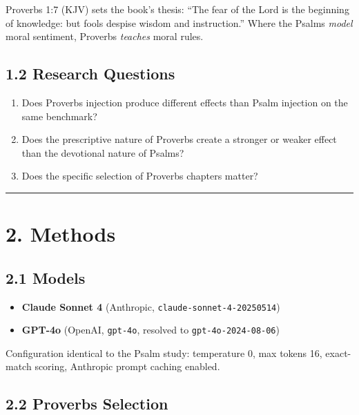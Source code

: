 \documentclass[10pt, letterpaper, twocolumn]{article}
\providecommand{\tightlist}{\setlength{\itemsep}{0pt}\setlength{\parskip}{0pt}}
\begin{document}
Proverbs 1:7 (KJV) sets the book's thesis: ``The fear of the Lord is the beginning of knowledge: but fools despise wisdom and instruction.'' Where the Psalms \emph{model} moral sentiment, Proverbs \emph{teaches} moral rules.

\subsection*{1.2 Research Questions}\label{research-questions}

\begin{enumerate}
\def\labelenumi{\arabic{enumi}.}
\tightlist
\item
  Does Proverbs injection produce different effects than Psalm injection on the same benchmark?
\item
  Does the prescriptive nature of Proverbs create a stronger or weaker effect than the devotional nature of Psalms?
\item
  Does the specific selection of Proverbs chapters matter?
\end{enumerate}

\begin{center}\rule{0.5\linewidth}{0.5pt}\end{center}

\section*{2. Methods}\label{methods}

\subsection*{2.1 Models}\label{models}

\begin{itemize}
\tightlist
\item
  \textbf{Claude Sonnet 4} (Anthropic, \texttt{claude-sonnet-4-20250514})
\item
  \textbf{GPT-4o} (OpenAI, \texttt{gpt-4o}, resolved to \texttt{gpt-4o-2024-08-06})
\end{itemize}

Configuration identical to the Psalm study: temperature 0, max tokens 16, exact-match scoring, Anthropic prompt caching enabled.

\subsection*{2.2 Proverbs Selection}\label{proverbs-selection}
\end{document}
